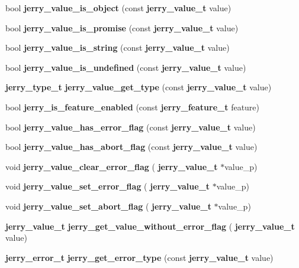\begin{DoxyCompactItemize}
bool {\bfseries jerry\+\_\+value\+\_\+is\+\_\+object} (const \textbf{ jerry\+\_\+value\+\_\+t} value)
\item 
\mbox{\label{group___core_gaa19d30b4210b70cabcc12e5d5879d2ba}} 
bool {\bfseries jerry\+\_\+value\+\_\+is\+\_\+promise} (const \textbf{ jerry\+\_\+value\+\_\+t} value)
\item 
\mbox{\label{group___core_ga0207f9d338a8b6c3bad5d510a8f075da}} 
bool {\bfseries jerry\+\_\+value\+\_\+is\+\_\+string} (const \textbf{ jerry\+\_\+value\+\_\+t} value)
\item 
\mbox{\label{group___core_gac289ca00056c9e67e5eda2074206b852}} 
bool {\bfseries jerry\+\_\+value\+\_\+is\+\_\+undefined} (const \textbf{ jerry\+\_\+value\+\_\+t} value)
\item 
\mbox{\label{group___core_ga672bfe0e4d22f9c78c2cd23ed6f37645}} 
\textbf{ jerry\+\_\+type\+\_\+t} {\bfseries jerry\+\_\+value\+\_\+get\+\_\+type} (const \textbf{ jerry\+\_\+value\+\_\+t} value)
\item 
bool \textbf{ jerry\+\_\+is\+\_\+feature\+\_\+enabled} (const \textbf{ jerry\+\_\+feature\+\_\+t} feature)
\item 
bool \textbf{ jerry\+\_\+value\+\_\+has\+\_\+error\+\_\+flag} (const \textbf{ jerry\+\_\+value\+\_\+t} value)
\item 
\mbox{\label{group___core_ga774ccd4f7d4c3b317ed21dc4255cce8b}} 
bool {\bfseries jerry\+\_\+value\+\_\+has\+\_\+abort\+\_\+flag} (const \textbf{ jerry\+\_\+value\+\_\+t} value)
\item 
\mbox{\label{group___core_gaaea7894b57bb072e90c7c5e08f3d96d2}} 
void {\bfseries jerry\+\_\+value\+\_\+clear\+\_\+error\+\_\+flag} (\textbf{ jerry\+\_\+value\+\_\+t} $\ast$value\+\_\+p)
\item 
\mbox{\label{group___core_ga1d5b7d4ffce1a4097ba52114fd4fff31}} 
void {\bfseries jerry\+\_\+value\+\_\+set\+\_\+error\+\_\+flag} (\textbf{ jerry\+\_\+value\+\_\+t} $\ast$value\+\_\+p)
\item 
\mbox{\label{group___core_gaa558694aa77836e8c61a76ac002831ae}} 
void {\bfseries jerry\+\_\+value\+\_\+set\+\_\+abort\+\_\+flag} (\textbf{ jerry\+\_\+value\+\_\+t} $\ast$value\+\_\+p)
\item 
\mbox{\label{group___core_ga7e248f314c6ae1835801954a4e11306b}} 
\textbf{ jerry\+\_\+value\+\_\+t} {\bfseries jerry\+\_\+get\+\_\+value\+\_\+without\+\_\+error\+\_\+flag} (\textbf{ jerry\+\_\+value\+\_\+t} value)
\item 
\textbf{ jerry\+\_\+error\+\_\+t} \textbf{ jerry\+\_\+get\+\_\+error\+\_\+type} (const \textbf{ jerry\+\_\+value\+\_\+t} value)

\end{DoxyCompactItemize}
